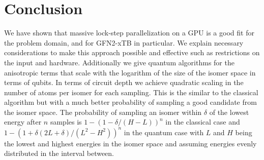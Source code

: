 \chapter{Conclusion}\label{sec:conclusion}

We have shown that massive lock-step parallelization on a GPU is a good fit for the problem domain, and for GFN2-xTB in particular. We explain necessary considerations to make this approach possible and effective such as restrictions on the input and hardware. Additionally we give quantum algorithms for the anisotropic terms that scale with the logarithm of the size of the isomer space in terms of qubits. In terms of circuit depth we achieve quadratic scaling in the number of atoms per isomer for each sampling. This is the similar to the classical algorithm but with a much better probability of sampling a good candidate from the isomer space. The probability of sampling an isomer within $\delta$ of the lowest energy after $n$ samples is $1-(1-\delta/(H-L))^n$ in the classical case and $1-(1+\delta(2L + \delta)/(L^2-H^2))^n$ in the quantum case with $L$ and $H$ being the lowest and highest energies in the isomer space and assuming energies evenly distributed in the interval between. 
